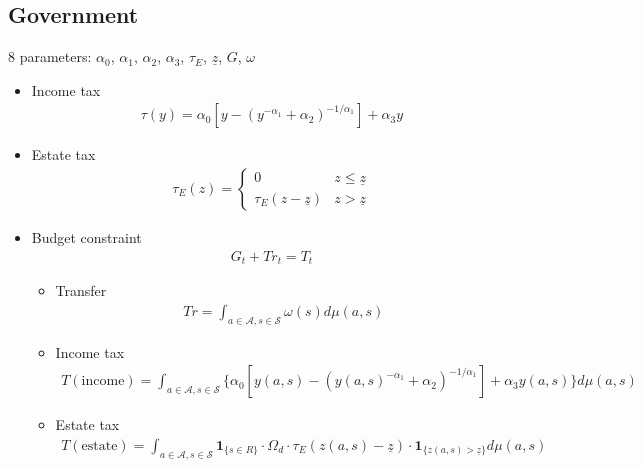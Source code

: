 \documentclass{article}
\begin{document}
\begin{spacing}{1.5}
\subsection{Government}
8 parameters: $\alpha_0$, $\alpha_1$, $\alpha_2$, $\alpha_3$, $\tau_E$, $\underline{z}$, $G$, $\omega$
\begin{itemize}
\item Income tax
\begin{align*}
\tau(y)=\alpha_0[y-(y^{-\alpha_1}+\alpha_2)^{-1/\alpha_1}]+\alpha_3y
\end{align*}
\item Estate tax
\begin{align*}
\tau_E(z)=\left\{\begin{array}{cc} 0 & z\leq\underline{z}\\ \tau_E(z-\underline{z}) & z>\underline{z} \end{array} \right.
\end{align*}
\item Budget constraint
\begin{align*}
G_t+Tr_t=T_t
\end{align*}
\begin{itemize}
\item Transfer 
\begin{align*}
Tr=\int_{a\in\mathcal{A}, s\in\mathcal{S}}\omega(s)d\mu(a,s)
\end{align*}
\item Income tax
\begin{align*}
T(\text{income})=\int_{a\in\mathcal{A}, s\in\mathcal{S}}\big\{\alpha_0[y(a,s)-(y(a,s)^{-\alpha_1}+\alpha_2)^{-1/\alpha_1}]+\alpha_3y(a,s)\big\}d\mu(a,s)
\end{align*}
\item Estate tax
\begin{align*}
T(\text{estate})=\int_{a\in\mathcal{A}, s\in\mathcal{S}}\textbf{1}_{\{s\in R\}}\cdot\Omega_d\cdot\tau_E(z(a,s)-\underline{z})\cdot\textbf{1}_{\{z(a,s)>\underline{z}\}}d\mu(a,s)\\
\end{align*}
\end{itemize}
\end{itemize}



\end{spacing}
\end{document}
